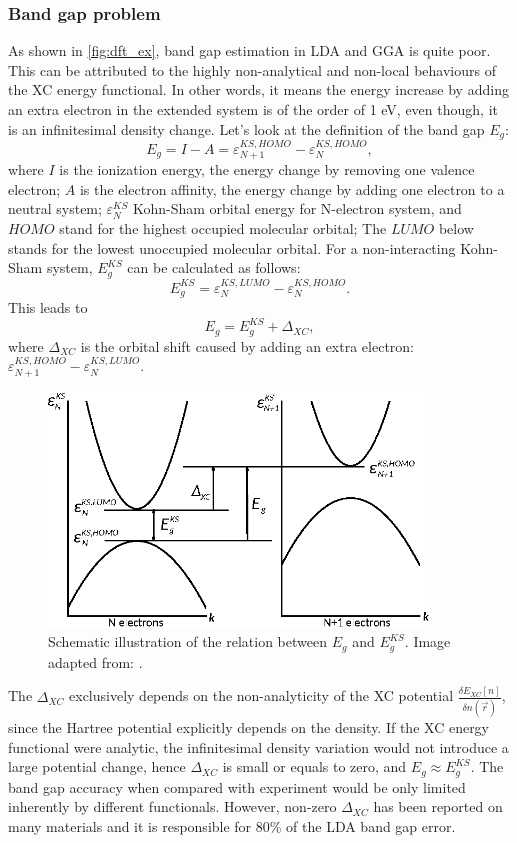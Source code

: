 \subsubsection{Band gap problem}
As shown in \autoref{fig:dft_ex}, band gap estimation in LDA and GGA is quite poor. This can be attributed to the highly non-analytical and non-local behaviours of the XC energy functional. In other words, it means the energy increase by adding an extra electron in the extended system is of the order of 1 eV, even though, it is an infinitesimal density change. Let's look at the definition of the band gap $E_{g}$:
\begin{equation}
E_{g}=I-A=\varepsilon_{N+1}^{KS,HOMO}-\varepsilon_N^{KS,HOMO},
\end{equation}
where $I$ is the ionization energy, the energy change by removing one valence electron; $A$ is the electron affinity, the energy change by adding one electron to a neutral system; $\varepsilon_N^{KS}$ Kohn-Sham orbital energy for N-electron system, and $HOMO$ stand for the highest occupied molecular orbital; The $LUMO$ below stands for the lowest unoccupied molecular orbital. For a non-interacting Kohn-Sham system, $E_{g}^{KS}$ can be calculated as follows:
\begin{equation}
E_{g}^{KS}=\varepsilon_{N}^{KS,LUMO}-\varepsilon_{N}^{KS,HOMO}.
\end{equation}
This leads to 
\begin{equation}
E_{g}=E_{g}^{KS}+\Delta_{XC},
\end{equation}
where $\Delta_{XC}$ is the orbital shift caused by adding an extra electron: $\varepsilon_{N+1}^{KS,HOMO}-\varepsilon_{N}^{KS,LUMO}$.
\begin{figure}[htbp!] 
\centering  
\includegraphics[width=0.9\textwidth]{Eg.eps}
\caption{ Schematic illustration of the relation between $E_g$ and $E^{KS}_g$. Image adapted from: \cite{fiolhais2008primer}.}  
\label{fig:dft_eg}
\end{figure} 
The $\Delta_{XC}$ exclusively depends on the non-analyticity of the XC potential $\frac{\delta E_{XC}[n]}{\delta n(\vec{r})}$, since the Hartree potential explicitly depends on the density. If the XC energy functional were analytic, the infinitesimal density variation would not introduce a large potential change, hence $\Delta_{XC}$ is small or equals to zero, and $E_g \approx E^{KS}_g$. The band gap accuracy when compared with experiment would be only limited inherently by different functionals. However, non-zero $\Delta_{XC}$ has been reported on many materials and it is responsible for 80\% of the LDA band gap error\cite{Godby1988}. 
